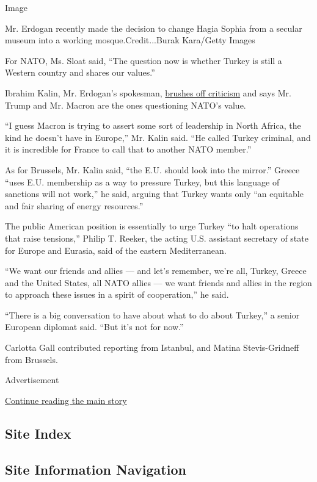 Image

Mr. Erdogan recently made the decision to change Hagia Sophia from a
secular museum into a working mosque.Credit...Burak Kara/Getty Images

For NATO, Ms. Sloat said, ``The question now is whether Turkey is still
a Western country and shares our values.''

Ibrahim Kalin, Mr. Erdogan's spokesman,
\href{http://www.epc.eu/en/past-events/Turkish-foreign-policy-in-an-age-of-uncertainty~35d928}{brushes
off criticism} and says Mr. Trump and Mr. Macron are the ones
questioning NATO's value.

``I guess Macron is trying to assert some sort of leadership in North
Africa, the kind he doesn't have in Europe,'' Mr. Kalin said. ``He
called Turkey criminal, and it is incredible for France to call that to
another NATO member.''

As for Brussels, Mr. Kalin said, ``the E.U. should look into the
mirror.'' Greece ``uses E.U. membership as a way to pressure Turkey, but
this language of sanctions will not work,'' he said, arguing that Turkey
wants only ``an equitable and fair sharing of energy resources.''

The public American position is essentially to urge Turkey ``to halt
operations that raise tensions,'' Philip T. Reeker, the acting U.S.
assistant secretary of state for Europe and Eurasia, said of the eastern
Mediterranean.

``We want our friends and allies --- and let's remember, we're all,
Turkey, Greece and the United States, all NATO allies --- we want
friends and allies in the region to approach these issues in a spirit of
cooperation,'' he said.

``There is a big conversation to have about what to do about Turkey,'' a
senior European diplomat said. ``But it's not for now.''

Carlotta Gall contributed reporting from Istanbul, and Matina
Stevis-Gridneff from Brussels.

Advertisement

\protect\hyperlink{after-bottom}{Continue reading the main story}

\hypertarget{site-index}{%
\subsection{Site Index}\label{site-index}}

\hypertarget{site-information-navigation}{%
\subsection{Site Information
Navigation}\label{site-information-navigation}}

